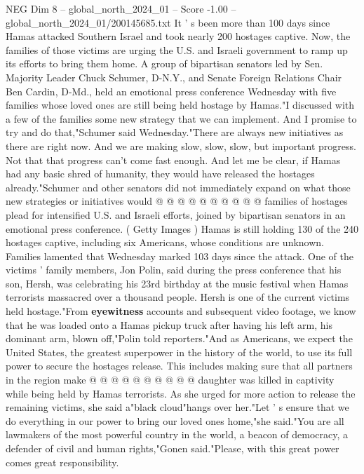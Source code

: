 \begin{textsample}{NEG Dim 8 – global\_north\_2024\_01 – Score -1.00 – global\_north\_2024\_01/200145685.txt}  \label{ex:f8_neg_280}
It ' s been more than 100 days since Hamas attacked Southern Israel and took nearly 200 hostages captive.
Now, the families of those victims are urging the U.S. and Israeli government to ramp up its efforts to bring them home.
A group of bipartisan senators led by Sen.
Majority Leader Chuck Schumer, D-N.Y., and Senate Foreign Relations Chair Ben Cardin, D-Md., held an emotional press conference Wednesday with five families whose loved ones are still being held hostage by Hamas."I discussed with a few of the families some new strategy that we can implement.
And I promise to try and do that,"Schumer said Wednesday."There are always new initiatives as there are right now.
And we are making slow, slow, slow, but important progress.
Not that that progress can't come fast enough.
And let me be clear, if Hamas had any basic shred of humanity, they would have released the hostages already."Schumer and other senators did not immediately expand on what those new strategies or initiatives would @ @ @ @ @ @ @ @ @ @ families of hostages plead for intensified U.S. and Israeli efforts, joined by bipartisan senators in an emotional press conference. ( Getty Images ) Hamas is still holding 130 of the 240 hostages captive, including six Americans, whose conditions are unknown.
Families lamented that Wednesday marked 103 days since the attack.
One of the victims ' family members, Jon Polin, said during the press conference that his son, Hersh, was celebrating his 23rd birthday at the music festival when Hamas terrorists massacred over a thousand people.
Hersh is one of the current victims held hostage."From \textbf{eyewitness} accounts and subsequent video footage, we know that he was loaded onto a Hamas pickup truck after having his left arm, his dominant arm, blown off,"Polin told reporters."And as Americans, we expect the United States, the greatest superpower in the history of the world, to use its full power to secure the hostages release.
This includes making sure that all partners in the region make @ @ @ @ @ @ @ @ @ @ daughter was killed in captivity while being held by Hamas terrorists.
As she urged for more action to release the remaining victims, she said a"black cloud"hangs over her."Let ' s ensure that we do everything in our power to bring our loved ones home,"she said."You are all lawmakers of the most powerful country in the world, a beacon of democracy, a defender of civil and human rights,"Gonen said."Please, with this great power comes great responsibility.

\end{textsample}
